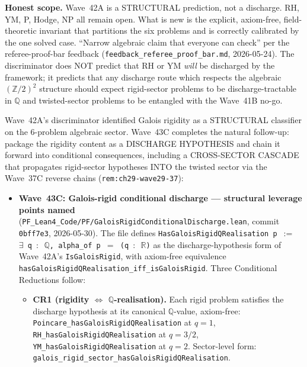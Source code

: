 \begin{remark}
\textbf{Honest scope.} Wave~42A is a STRUCTURAL prediction, not a discharge. RH, YM, P, Hodge, NP all remain open. What is new is the explicit, axiom-free, field-theoretic invariant that partitions the six problems and is correctly calibrated by the one solved case. ``Narrow algebraic claim that everyone can check'' per the referee-proof-bar feedback (\texttt{feedback\_referee\_proof\_bar.md}, 2026-05-24). The discriminator does NOT predict that RH or YM \emph{will} be discharged by the framework; it predicts that any discharge route which respects the algebraic $(\mathbb{Z}/2)^2$ structure should expect rigid-sector problems to be discharge-tractable in $\mathbb{Q}$ and twisted-sector problems to be entangled with the Wave~41B no-go.
\end{remark}

\begin{remark}\label{rem:ch29-wave43c-lean}
Wave~42A's discriminator identified Galois rigidity as a STRUCTURAL classifier on the 6-problem algebraic sector. Wave~43C completes the natural follow-up: package the rigidity content as a DISCHARGE HYPOTHESIS and chain it forward into conditional consequences, including a CROSS-SECTOR CASCADE that propagates rigid-sector hypotheses INTO the twisted sector via the Wave~37C reverse chains (\texttt{rem:ch29-wave29-37}):
\begin{itemize}
  \item \textbf{Wave~43C: Galois-rigid conditional discharge --- structural leverage points named} (\texttt{PF\_Lean4\_Code/PF/GaloisRigidConditionalDischarge.lean}, commit \texttt{0bff7e3}, 2026-05-30). The file defines \texttt{HasGaloisRigidQRealisation p $:=$ $\exists$ q $:$ $\mathbb{Q}$, alpha\_of p $=$ (q $:$ $\mathbb{R}$)} as the discharge-hypothesis form of Wave~42A's \texttt{IsGaloisRigid}, with axiom-free equivalence \texttt{hasGaloisRigidQRealisation\_iff\_isGaloisRigid}. Three Conditional Reductions follow:
  \begin{itemize}
    \item \textbf{CR1 (rigidity $\Leftrightarrow$ $\mathbb{Q}$-realisation).} Each rigid problem satisfies the discharge hypothesis at its canonical $\mathbb{Q}$-value, axiom-free: \texttt{Poincare\_hasGaloisRigidQRealisation} at $q = 1$, \texttt{RH\_hasGaloisRigidQRealisation} at $q = 3/2$, \texttt{YM\_hasGaloisRigidQRealisation} at $q = 2$. Sector-level form: \texttt{galois\_rigid\_sector\_hasGaloisRigidQRealisation}.

\end{itemize}
\end{itemize}
\end{remark}
